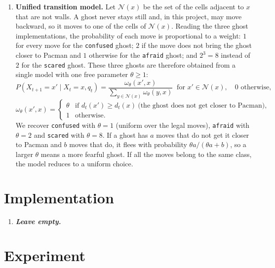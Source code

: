 \documentclass{article}
\begin{document}
\begin{enumerate}[label=\alph*.,leftmargin=*]
    \item \textbf{Unified transition model.}
    Let $\mathcal N(x)$ be the set of the cells adjacent to $x$ that are not
    walls. A ghost never stays still and, in this project, may move backward,
    so it moves to one of the cells of $\mathcal N(x)$. Reading the three ghost
    implementations, the probability of each move is proportional to a weight:
    $1$ for every move for the \texttt{confused} ghost; $2$ if the move does
    not bring the ghost closer to Pacman and $1$ otherwise for the
    \texttt{afraid} ghost; and $2^3=8$ instead of $2$ for the \texttt{scared}
    ghost. These three ghosts are therefore obtained from a single model with
    one free parameter $\theta\ge 1$:
    \begin{equation*}
        P(X_{t+1}=x' \mid X_t=x, q_t) =
        \frac{\omega_\theta(x',x)}{\sum_{y\in\mathcal N(x)}\omega_\theta(y,x)}
        \ \text{ for } x'\in\mathcal N(x), \quad 0 \text{ otherwise,}
    \end{equation*}
    \begin{equation*}
        \omega_\theta(x',x) =
        \begin{cases}
            \theta & \text{if } d_t(x') \ge d_t(x)
                    \ \text{(the ghost does not get closer to Pacman)},\\
            1 & \text{otherwise.}
        \end{cases}
    \end{equation*}
    We recover \texttt{confused} with $\theta=1$ (uniform over the legal
    moves), \texttt{afraid} with $\theta=2$ and \texttt{scared} with
    $\theta=8$. If a ghost has $a$ moves that do not get it closer to Pacman
    and $b$ moves that do, it flees with probability $\theta a/(\theta a+b)$,
    so a larger $\theta$ means a more fearful ghost. If all the moves belong
    to the same class, the model reduces to a uniform choice.
\end{enumerate}

\section{Implementation}

\begin{enumerate}[label=\alph*.,leftmargin=*]
    \item \textbf{\textit{Leave empty.}}
\end{enumerate}

\section{Experiment}
\end{document}
